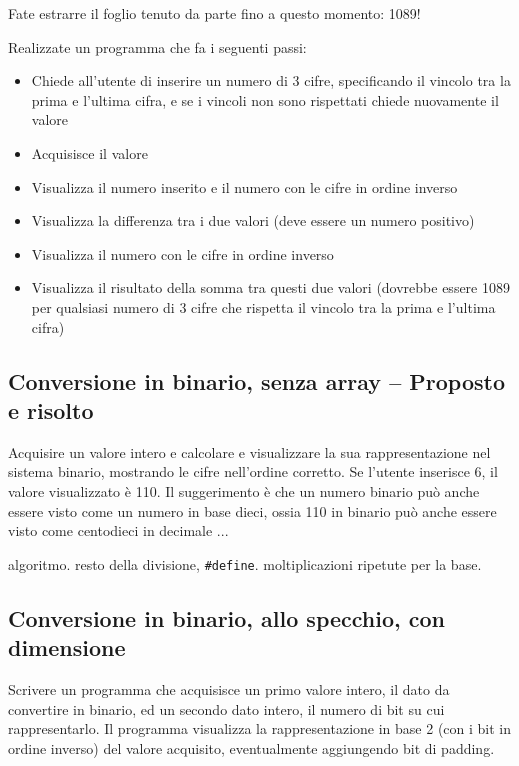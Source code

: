 Fate estrarre il foglio tenuto da parte fino a questo momento: 1089!

Realizzate un programma che fa i seguenti passi:\begin{itemize}
\item    Chiede all'utente di inserire un numero di 3 cifre, specificando il vincolo tra la prima e l'ultima cifra, e se i vincoli non sono rispettati chiede nuovamente il valore
\item    Acquisisce il valore
\item    Visualizza il numero inserito e il numero con le cifre in ordine inverso
\item    Visualizza la differenza tra i due valori (deve essere un numero positivo)
\item    Visualizza il numero con le cifre in ordine inverso
\item    Visualizza il risultato della somma tra questi due valori (dovrebbe essere 1089 per qualsiasi numero di 3 cifre che rispetta il vincolo tra la prima e l'ultima cifra)
\end{itemize}


\prosep{}

\subsection{Conversione in binario, senza array -- Proposto e risolto}
Acquisire un valore intero e calcolare e visualizzare la sua rappresentazione nel sistema binario, mostrando le cifre nell'ordine corretto. Se l'utente inserisce 6, il valore visualizzato \`e 110.
Il suggerimento \`e che un numero binario pu\`o anche essere visto come un numero in base dieci, ossia 110 in binario pu\`o anche essere visto come centodieci in decimale ...

\begin{tags}
algoritmo. resto della divisione, \texttt{\#define}. moltiplicazioni ripetute per la base.
\end{tags}


\subsection{Conversione in binario, allo specchio, con dimensione}
Scrivere un programma che acquisisce un primo valore intero, il dato da convertire in binario, ed un secondo dato intero, il numero di bit su cui rappresentarlo. Il programma visualizza la rappresentazione in base 2 (con i bit in ordine inverso) del valore acquisito, eventualmente aggiungendo bit di padding.

